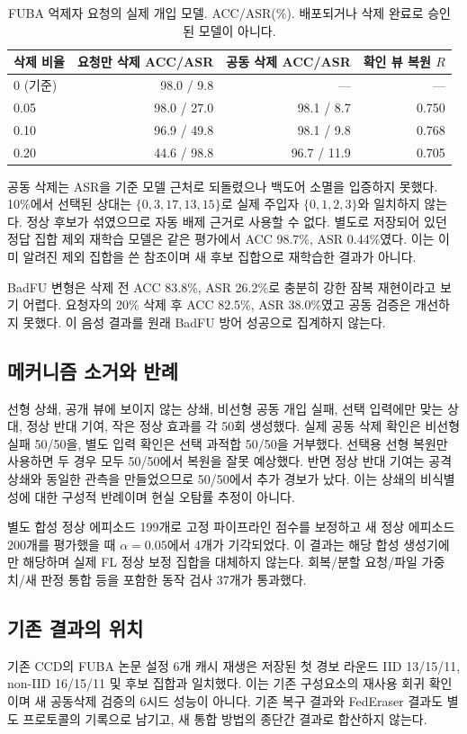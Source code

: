 \documentclass[10pt,a4paper]{article}
\begin{document}
\begin{table}[ht]\centering\small
\caption{FUBA 억제자 요청의 실제 개입 모델. ACC/ASR(\%). 배포되거나 삭제 완료로 승인된 모델이 아니다.}
\begin{tabular}{lrrr}\toprule
삭제 비율 & 요청만 삭제 ACC/ASR & 공동 삭제 ACC/ASR & 확인 뷰 복원 $R$\\\midrule
0 (기준) & 98.0 / 9.8 & --- & ---\\
0.05 & 98.0 / 27.0 & 98.1 / 8.7 & 0.750\\
0.10 & 96.9 / 49.8 & 98.1 / 9.8 & 0.768\\
0.20 & 44.6 / 98.8 & 96.7 / 11.9 & 0.705\\\bottomrule
\end{tabular}
\end{table}
공동 삭제는 ASR을 기준 모델 근처로 되돌렸으나 백도어 소멸을 입증하지 못했다.
10\%에서 선택된 상대는 $\{0,3,17,13,15\}$로 실제 주입자 $\{0,1,2,3\}$와 일치하지 않는다.
정상 후보가 섞였으므로 자동 배제 근거로 사용할 수 없다.
별도로 저장되어 있던 정답 집합 제외 재학습 모델은 같은 평가에서 ACC 98.7\%, ASR 0.44\%였다.
이는 이미 알려진 제외 집합을 쓴 참조이며 새 후보 집합으로 재학습한 결과가 아니다.

BadFU 변형은 삭제 전 ACC 83.8\%, ASR 26.2\%로 충분히 강한 잠복 재현이라고 보기 어렵다.
요청자의 20\% 삭제 후 ACC 82.5\%, ASR 38.0\%였고 공동 검증은 개선하지 못했다.
이 음성 결과를 원래 BadFU 방어 성공으로 집계하지 않는다.

\subsection{메커니즘 소거와 반례}
선형 상쇄, 공개 뷰에 보이지 않는 상쇄, 비선형 공동 개입 실패,
선택 입력에만 맞는 상대, 정상 반대 기여, 작은 정상 효과를 각 50회 생성했다.
실제 공동 삭제 확인은 비선형 실패 50/50을, 별도 입력 확인은 선택 과적합 50/50을 거부했다.
선택용 선형 복원만 사용하면 두 경우 모두 50/50에서 복원을 잘못 예상했다.
반면 정상 반대 기여는 공격 상쇄와 동일한 관측을 만들었으므로 50/50에서 추가 경보가 났다.
이는 상쇄의 비식별성에 대한 구성적 반례이며 현실 오탐률 추정이 아니다.

별도 합성 정상 에피소드 199개로 고정 파이프라인 점수를 보정하고
새 정상 에피소드 200개를 평가했을 때 $\alpha=0.05$에서 4개가 기각되었다.
이 결과는 해당 합성 생성기에만 해당하며 실제 FL 정상 보정 집합을 대체하지 않는다.
회복/분할 요청/파일 가중치/새 판정 통합 등을 포함한 동작 검사 37개가 통과했다.

\subsection{기존 결과의 위치}
기존 CCD의 FUBA 논문 설정 6개 캐시 재생은 저장된 첫 경보 라운드
IID 13/15/11, non-IID 16/15/11 및 후보 집합과 일치했다.
이는 기존 구성요소의 재사용 회귀 확인이며 새 공동삭제 검증의 6시드 성능이 아니다.
기존 복구 결과와 FedEraser 결과도 별도 프로토콜의 기록으로 남기고,
새 통합 방법의 종단간 결과로 합산하지 않는다.
\end{document}

